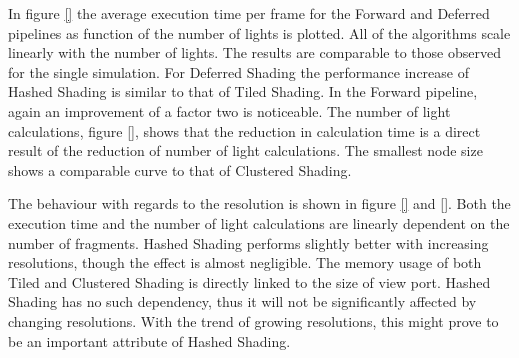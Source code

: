 
In figure \ref{} the average execution time per frame for the Forward and Deferred pipelines as
function of the number of lights is plotted. All of the algorithms scale linearly with the
number of lights. The results are comparable to those observed for the single simulation. For Deferred
Shading the performance increase of Hashed Shading is similar to that of Tiled Shading. In
the Forward pipeline, again an improvement of a factor two is noticeable.
The number of light calculations, figure \ref{}, shows that the reduction in calculation time
is a direct result of the reduction of number of light calculations. The smallest node
size shows a comparable curve to that of Clustered Shading.

The behaviour with regards to the resolution is shown in figure \ref{} and \ref{}.
Both the execution time and the number of light calculations are linearly dependent on
the number of fragments. 
Hashed Shading performs slightly better with increasing resolutions, though the effect
is almost negligible. The memory usage of both Tiled and Clustered Shading is directly
linked to the size of view port. Hashed Shading has no such dependency, thus it will not
be significantly affected by changing resolutions. With the trend of growing resolutions,
this might prove to be an important attribute of Hashed Shading.

